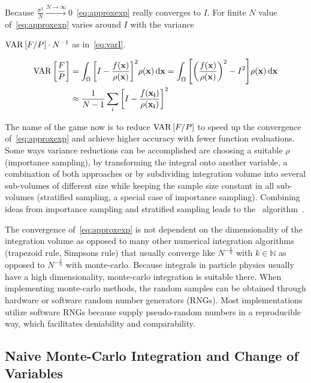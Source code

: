 Because
\(\frac{\sigma^2}{N}\xrightarrow{N\rightarrow\infty}
0\)~\eqref{eq:approxexp} really converges to \(I\). For finite \(N\)
value of~\eqref{eq:approxexp} varies around \(I\) with the variance

\(\operatorname{VAR}\qty[F/P]\cdot N^{-1}\) as in~\eqref{eq:varI}.

\begin{align}
  \operatorname{VAR}\qty[\frac{F}{P}] &= \int_\Omega \qty[I -
  \frac{f(\vb{x})}{\rho(\vb{x})}]^2 \rho({\vb{x}}) \dd{\vb{x}} =
  \int_\Omega \qty[\qty(\frac{f(\vb{x})}{\rho(\vb{x})})^2 -
  I^2]\rho({\vb{x}}) \dd{\vb{x}}   \label{eq:varI}
 \\
  &\approx \frac{1}{N - 1}\sum_i \qty[I -
  \frac{f(\vb{x_i})}{\rho(\vb{x_i})}]^2  \label{eq:varI-approx}
\end{align}

The name of the game now is to reduce \(\operatorname{VAR}\qty[F/P]\) to speed up the
convergence of~\eqref{eq:approxexp} and achieve higher accuracy with
fewer function evaluations. Some ways variance reductions can be
accomplished are choosing a suitable \(\rho\) (importance sampling),
by transforming the integral onto another variable, a combination of
both approaches or by subdividing integration volume into several
sub-volumes of different size while keeping the sample size constant
in all sub-volumes (stratified sampling, a special case of importance
sampling). Combining ideas from importance sampling and stratified
sampling leads to the \vegas\ algorithm~\cite{Lepage:19781an}.

The convergence of~\eqref{eq:approxexp} is not dependent on the
dimensionality of the integration volume as opposed to many other
numerical integration algorithms (trapezoid rule, Simpsons rule) that
usually converge like \(N^{-\frac{k}{n}}\) with \(k\in\mathbb{N}\) as
opposed to \(N^{-\frac{k}{n}}\) with monte-carlo. Because integrals in
particle physics usually have a high dimensionality, monte-carlo
integration is suitable there. When implementing monte-carlo methods,
the random samples can be obtained through hardware or software random
number generators (RNGs). Most implementations utilize software RNGs
because supply pseudo-random numbers in a reproducible way, which
facilitates deniability and comparability.

\subsection{Naive Monte-Carlo Integration and Change of Variables}
\label{sec:naivechange}

